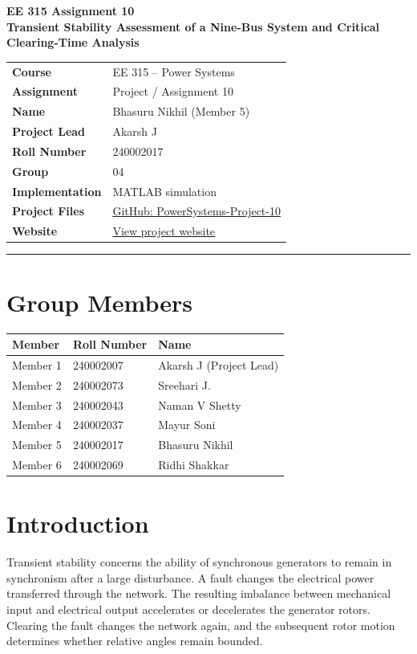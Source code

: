 \documentclass[11pt,a4paper]{article}
\begin{document}
\begin{center}\large\textbf{EE 315 Assignment 10}\\[5pt]\Large\textbf{Transient Stability Assessment of a Nine-Bus System and Critical Clearing-Time Analysis}\end{center}
\begin{tabular}{ll}
\textbf{Course}&EE 315 -- Power Systems\\
\textbf{Assignment}&Project / Assignment 10\\
\textbf{Name}&Bhasuru Nikhil (Member 5)\\
\textbf{Project Lead}&Akarsh J\\
\textbf{Roll Number}&240002017\\
\textbf{Group}&04\\
\textbf{Implementation}&MATLAB simulation\\
\textbf{Project Files}&\href{https://github.com/pacificblaster1708/PowerSystems-Project-10}{GitHub: PowerSystems-Project-10}\\
\textbf{Website}&\href{https://pacificblaster1708.github.io/PowerSystems-Project-10/}{View project website}
\end{tabular}
\vspace{10pt}\hrule
\section{Group Members}
\begin{center}\begin{tabular}{lll}\toprule Member&Roll Number&Name\\\midrule
Member 1&240002007&Akarsh J (Project Lead)\\
Member 2&240002073&Sreehari J.\\
Member 3&240002043&Naman V Shetty\\
Member 4&240002037&Mayur Soni\\
Member 5&240002017&Bhasuru Nikhil\\
Member 6&240002069&Ridhi Shakkar\\\bottomrule\end{tabular}\end{center}
\section{Introduction}
Transient stability concerns the ability of synchronous generators to remain in synchronism after a large disturbance. A fault changes the electrical power transferred through the network. The resulting imbalance between mechanical input and electrical output accelerates or decelerates the generator rotors. Clearing the fault changes the network again, and the subsequent rotor motion determines whether relative angles remain bounded.
\end{document}
